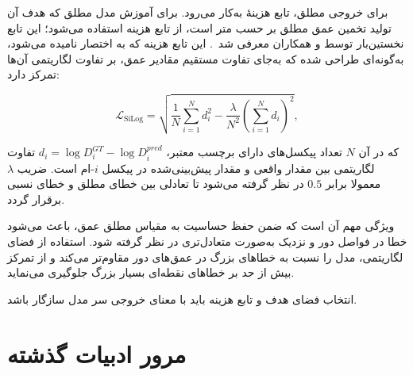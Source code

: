 برای خروجی مطلق، تابع هزینهٔ  به‌کار می‌رود.
برای آموزش مدل مطلق که هدف آن تولید تخمین عمق مطلق بر حسب متر است، از تابع هزینه  استفاده می‌شود؛ این تابع نخستین‌بار توسط  و همکاران معرفی شد~\cite{Eigen2014Depth}. این تابع هزینه که به اختصار  نامیده می‌شود، به‌گونه‌ای طراحی شده که به‌جای تفاوت مستقیم مقادیر عمق، بر تفاوت لگاریتمی آن‌ها تمرکز دارد:

\begin{equation}
\mathcal{L}_{\text{SiLog}} = \sqrt{\frac{1}{N} \sum_{i=1}^{N} d_i^2 - \frac{\lambda}{N^2} \left( \sum_{i=1}^{N} d_i \right)^2},
\end{equation}

که در آن $N$ تعداد پیکسل‌های دارای برچسب معتبر، $d_i = \log D_i^{GT} - \log D_i^{pred}$ تفاوت لگاریتمی بین مقدار واقعی و مقدار پیش‌بینی‌شده در پیکسل $i$-ام است. ضریب $\lambda$ معمولا برابر $0.5$ در نظر گرفته می‌شود تا تعادلی بین خطای مطلق و خطای نسبی برقرار گردد.

ویژگی مهم  آن است که ضمن حفظ حساسیت به مقیاس مطلق عمق، باعث می‌شود خطا در فواصل دور و نزدیک به‌صورت متعادل‌تری در نظر گرفته شود. استفاده از فضای لگاریتمی، مدل را نسبت به خطاهای بزرگ در عمق‌های دور مقاوم‌تر می‌کند و از تمرکز بیش از حد بر خطاهای نقطه‌ای بسیار بزرگ جلوگیری می‌نماید.

انتخاب فضای هدف و تابع هزینه باید با معنای خروجی سر مدل سازگار باشد.

\section{مرور ادبیات گذشته}
\label{sec:ch2_literature}

